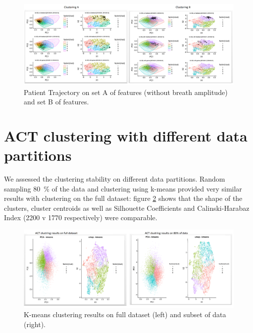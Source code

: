 \documentclass{article}
\begin{document}
\begin{figure}[H]
  \centering
  \includegraphics[]{ACTclusteringAB.png}
  \caption{Patient Trajectory on set A of features (without breath amplitude) and set B of features.}
  \label{fig:ACTclusteringAB}
\end{figure}



\section{ACT clustering with different data partitions}
\label{appendix:actdatapartitions}

We assessed the clustering stability on different data partitions. Random sampling 80~\% of the data and clustering using k-means provided very similar results with clustering on the full dataset: figure \ref{fig:ACTclusteringon80} shows that the shape of the clusters, cluster centroids as well as Silhouette Coefficients and Calinski-Harabaz Index (2200 v 1770 respectively) were comparable. 

\begin{figure}[H]
  \centering
  \includegraphics[]{ACTclusteringOn80.png}
  \caption{K-means clustering results on full dataset (left) and subset of data (right).}
  \label{fig:ACTclusteringon80}
\end{figure}
\end{document}
